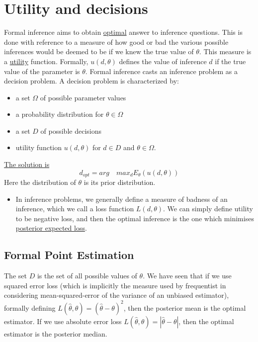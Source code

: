 \documentclass[lecture,12pt,]{pcms-l}
\numberwithin{section}{chapter}
\numberwithin{equation}{chapter}
\theoremstyle{plain}
\theoremstyle{definition}
\theoremstyle{definition}
\begin{document}
\section{Utility and decisions}
Formal inference aims to obtain \underline{optimal} answer to inference questions. This is done with reference to a measure of how good or bad the various possible inferences would be deemed to be if we knew the true value of $\theta$. This measure is a \underline{utility} function. Formally, $u(d,\theta)$ defines the value of inference $d$ if the true value of the parameter is $\theta$. Formal inference casts an inference problem as a decision problem. A decision problem is characterized by:
\begin{itemize}
\item a set $\Omega$ of possible parameter values
\item a probability distribution for $\theta \in \Omega$
\item a set $D$ of possible decisions
\item utility function $u(d,\theta)$ for $d \in D$ and $\theta \in \Omega$.
\end{itemize}
\underline{The solution is}
\begin{equation}
\boxed{d_{opt}=arg \quad max_d E_{\theta}(u(d, \theta))}
\end{equation}
Here the distribution of $\theta$ is its prior distribution.
\begin{itemize}
\item In inference problems, we generally define a measure of badness of an inference, which we call a loss function $L(d, \theta)$. We can simply define utility to be negative loss, and then the optimal inference is the one which minimises \underline{posterior expected loss}.
\end{itemize}
\subsection{Formal Point Estimation}
The set $D$ is the set of all possible values of $\theta$. We have seen that if we use squared error loss (which is implicitly the measure used by frequentist in considering mean-squared-error of the variance of an unbiased estimator), formally defining $L(\hat{\theta}, \theta)=(\hat{\theta}-\theta)^2$, then the posterior mean is the optimal estimator. If we use absolute error loss $L(\hat{\theta}, \theta)=\left | \hat{\theta}-\theta \right |$, then the optimal estimator is the posterior median.
\end{document}
